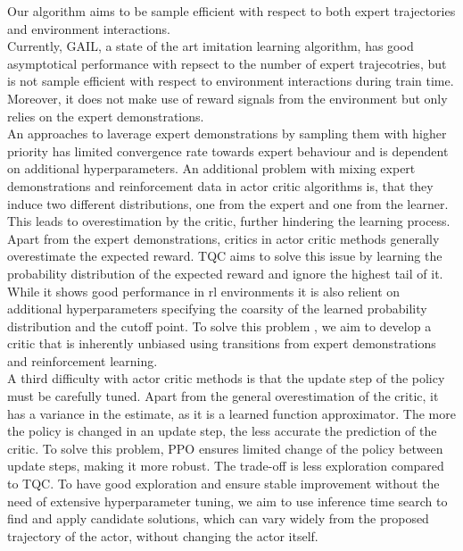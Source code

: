 Our algorithm aims to be sample efficient with respect to both expert trajectories and environment interactions. \\

Currently, GAIL, a state of the art imitation learning algorithm, has good asymptotical performance with repsect to the number of expert trajecotries, but is not sample efficient 
with respect to environment interactions during train time. Moreover, it does not make use of reward signals from the environment but only relies on the expert demonstrations.\\ 

An approaches to laverage expert demonstrations by sampling them with higher priority \cite{vecerik2018leveraging} has limited convergence rate towards expert behaviour and is dependent on additional hyperparameters. 
An additional problem with mixing expert demonstrations and reinforcement data in actor critic algorithms is, that they induce two different distributions, one from the expert and one from 
the learner. This leads to overestimation by the critic, further hindering the learning process. \\

Apart from the expert demonstrations, critics in actor critic methods generally overestimate the expected reward. TQC \cite{TQC_Paper} aims to solve this issue by learning the 
probability distribution of the expected reward and ignore the highest tail of it. While it shows good performance in \ac{rl} environments 
it is also relient on additional hyperparameters 
specifying the coarsity of the learned probability distribution and the cutoff point. To solve this problem , we aim to develop a critic that is inherently unbiased using transitions from expert demonstrations 
and reinforcement learning.\\

A third difficulty with actor critic methods is that the update step of the policy must be carefully tuned. Apart from the general overestimation of the critic, it has a variance in the estimate, 
as it is a learned function approximator. The more the policy is changed in an update step, the less accurate the prediction of the critic. To solve this problem, PPO ensures limited change of the policy 
between update steps, making it more robust. The trade-off is less exploration compared to TQC. To have good exploration 
and ensure stable improvement without the need of extensive hyperparameter tuning, we aim to use inference time search to find and apply candidate solutions, which can vary widely from the 
proposed trajectory of the actor, without changing the actor itself. \\

